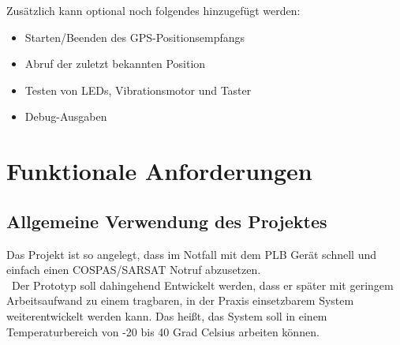 Zusätzlich kann optional noch folgendes hinzugefügt werden:

\begin{itemize}
	\item Starten/Beenden des GPS-Positionsempfangs
	\item Abruf der zuletzt bekannten Position
	\item Testen von LEDs, Vibrationsmotor und Taster
	\item Debug-Ausgaben
\end{itemize}

\newpage

\section{Funktionale Anforderungen}
\subsection{Allgemeine Verwendung des Projektes}
Das Projekt ist so angelegt, dass im Notfall mit dem PLB Gerät schnell und einfach einen COSPAS/SARSAT Notruf abzusetzen. \\\
Der Prototyp soll dahingehend Entwickelt werden, dass er später mit geringem Arbeitsaufwand zu einem tragbaren, in der Praxis einsetzbarem System weiterentwickelt werden kann.
Das heißt, das System soll in einem Temperaturbereich von -20 bis 40 Grad Celsius arbeiten können.
